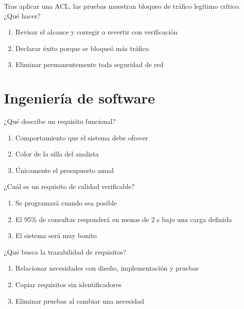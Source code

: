 \noindent\begin{minipage}{\linewidth}\setlength{\parskip}{4pt}\label{q:R-100}
Tras aplicar una ACL, las pruebas muestran bloqueo de tráfico legítimo crítico. ¿Qué hacer?
\begin{enumerate}[label=\Alph*),nosep]
\item Revisar el alcance y corregir o revertir con verificación
\item Declarar éxito porque se bloqueó más tráfico
\item Eliminar permanentemente toda seguridad de red
\end{enumerate}\end{minipage}\par\medskip

\section{Ingeniería de software}

\noindent\begin{minipage}{\linewidth}\setlength{\parskip}{4pt}\label{q:S-001}
¿Qué describe un requisito funcional?
\begin{enumerate}[label=\Alph*),nosep]
\item Comportamiento que el sistema debe ofrecer
\item Color de la silla del analista
\item Únicamente el presupuesto anual
\end{enumerate}\end{minipage}\par\medskip

\noindent\begin{minipage}{\linewidth}\setlength{\parskip}{4pt}\label{q:S-002}
¿Cuál es un requisito de calidad verificable?
\begin{enumerate}[label=\Alph*),nosep]
\item Se programará cuando sea posible
\item El 95\% de consultas responderá en menos de 2 s bajo una carga definida
\item El sistema será muy bonito
\end{enumerate}\end{minipage}\par\medskip

\noindent\begin{minipage}{\linewidth}\setlength{\parskip}{4pt}\label{q:S-003}
¿Qué busca la trazabilidad de requisitos?
\begin{enumerate}[label=\Alph*),nosep]
\item Relacionar necesidades con diseño, implementación y pruebas
\item Copiar requisitos sin identificadores
\item Eliminar pruebas al cambiar una necesidad
\end{enumerate}\end{minipage}\par\medskip

